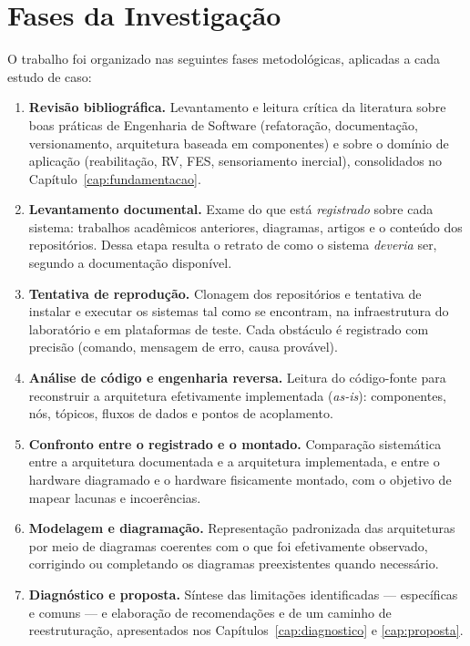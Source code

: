 \section{Fases da Investigação}

O trabalho foi organizado nas seguintes fases metodológicas, aplicadas a cada estudo de
caso:

\begin{enumerate}
	\item \textbf{Revisão bibliográfica.} Levantamento e leitura crítica da literatura
	      sobre boas práticas de Engenharia de Software (refatoração, documentação,
	      versionamento, arquitetura baseada em componentes) e sobre o domínio de aplicação
	      (reabilitação, RV, FES, sensoriamento inercial), consolidados no
	      Capítulo~\ref{cap:fundamentacao}.
	\item \textbf{Levantamento documental.} Exame do que está \emph{registrado} sobre cada
	      sistema: trabalhos acadêmicos anteriores, diagramas, artigos e o conteúdo dos
	      repositórios. Dessa etapa resulta o retrato de como o sistema \emph{deveria} ser,
	      segundo a documentação disponível.
	\item \textbf{Tentativa de reprodução.} Clonagem dos repositórios e tentativa de
	      instalar e executar os sistemas tal como se encontram, na infraestrutura do
	      laboratório e em plataformas de teste. Cada obstáculo é registrado com precisão
	      (comando, mensagem de erro, causa provável).
	\item \textbf{Análise de código e engenharia reversa.} Leitura do código-fonte para
	      reconstruir a arquitetura efetivamente implementada (\emph{as-is}): componentes,
	      nós, tópicos, fluxos de dados e pontos de acoplamento.
	\item \textbf{Confronto entre o registrado e o montado.} Comparação sistemática entre a
	      arquitetura documentada e a arquitetura implementada, e entre o hardware
	      diagramado e o hardware fisicamente montado, com o objetivo de mapear lacunas e
	      incoerências.
	\item \textbf{Modelagem e diagramação.} Representação padronizada das arquiteturas por
	      meio de diagramas coerentes com o que foi efetivamente observado, corrigindo ou
	      completando os diagramas preexistentes quando necessário.
	\item \textbf{Diagnóstico e proposta.} Síntese das limitações identificadas ---
	      específicas e comuns --- e elaboração de recomendações e de um caminho de
	      reestruturação, apresentados nos Capítulos~\ref{cap:diagnostico} e
	      \ref{cap:proposta}.
\end{enumerate}

